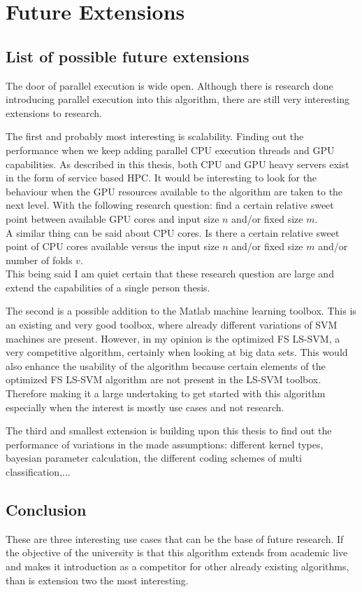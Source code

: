 
\chapter{Future Extensions}
\section{List of possible future extensions}
The door of parallel execution is wide open.
Although there is research done introducing parallel execution into this algorithm, there are still very interesting extensions to research.
\par
The first and probably most interesting is scalability.
Finding out the performance when we keep adding parallel CPU execution threads and GPU capabilities.
As described in this thesis, both CPU and GPU heavy servers exist in the form of service based HPC.
It would be interesting to look for the behaviour when the GPU resources available to the algorithm are taken to the next level.
With the following research question: find a certain relative sweet point between available GPU cores and input size $n$ and/or fixed size $m$.\\
A similar thing can be said about CPU cores. 
Is there a certain relative sweet point of CPU cores available versus the input size $n$ and/or fixed size $m$ and/or number of folds $v$.\\
This being said I am quiet certain that these research question are large and extend the capabilities of a single person thesis.
\par 
The second is a possible addition to the Matlab machine learning toolbox.
This is an existing and very good toolbox, where already different variations of SVM machines are present.
However, in my opinion is the optimized FS LS-SVM, a very competitive algorithm, certainly when looking at big data sets.
This would also enhance the usability of the algorithm because certain elements of the optimized FS LS-SVM algorithm are not present in the LS-SVM toolbox.
Therefore making it a large undertaking to get started with this algorithm especially when the interest is mostly use cases and not research.
\par 
The third and smallest extension is building upon this thesis to find out the performance of variations in the made assumptions:
different kernel types, bayesian parameter calculation, the different coding schemes of multi classification,...
\section{Conclusion}
These are three interesting use cases that can be the base of future research.
If the objective of the university is that this algorithm extends from academic live and makes it introduction as a competitor for other already existing algorithms, than is extension two the most interesting.
